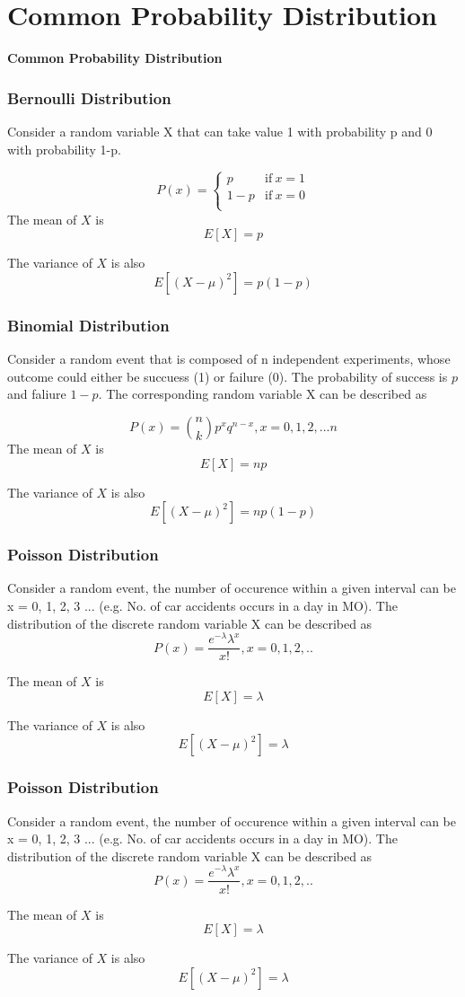\documentclass[notheorems, aspectratio=54]{beamer}
\begin{document}
\section{Common Probability Distribution}
\begin{frame}
\begin{center}
\bf{Common Probability Distribution }
\end{center}
\end{frame}


\begin{frame}
\frametitle{Bernoulli Distribution}
Consider a random variable X that can take value 1 with probability p and 0 with probability 1-p.

$$    
P(x) =
    \left\{
        \begin{array}{cc}
                p & \mathrm{if\ } x=1 \\
                1-p & \mathrm{if\ } x=0 \\
        \end{array} 
    \right.
$$
The mean of $X$ is 
$$
E[X]=p
$$

The variance of $X$ is also
$$
E[(X-\mu)^2]=p(1-p)
$$
\end{frame}

\begin{frame}
\frametitle{Binomial Distribution}
Consider a random event that is composed of n independent experiments, whose outcome could either be succuess (1) or failure (0). The probability of success is $p$ and faliure $1-p$. The corresponding random variable X can be described as

$$ P(x) =  {{n}\choose{k}} p^xq^{n-x}, x=0, 1, 2, ...n$$
The mean of $X$ is 
$$
E[X]=np
$$

The variance of $X$ is also
$$
E[(X-\mu)^2]=np(1-p)
$$
\end{frame}

\begin{frame}
\frametitle{Poisson Distribution}
Consider a random event, the number of occurence within a given interval can be x = 0, 1, 2, 3 ... (e.g. No. of car accidents occurs in a day in MO). The distribution of the discrete random variable X can be described as 
$$
P\left( x \right) = \frac{{e^{ - \lambda } \lambda ^x }}{{x!}}, x = 0, 1, 2, ..
$$

The mean of $X$ is 
$$
E[X]=\lambda
$$

The variance of $X$ is also
$$
E[(X-\mu)^2]=\lambda
$$
\end{frame}

\begin{frame}
\frametitle{Poisson Distribution}
Consider a random event, the number of occurence within a given interval can be x = 0, 1, 2, 3 ... (e.g. No. of car accidents occurs in a day in MO). The distribution of the discrete random variable X can be described as 
$$
P\left( x \right) = \frac{{e^{ - \lambda } \lambda ^x }}{{x!}}, x = 0, 1, 2, ..
$$

The mean of $X$ is 
$$
E[X]=\lambda
$$

The variance of $X$ is also
$$
E[(X-\mu)^2]=\lambda
$$
\end{frame}
\end{document}

